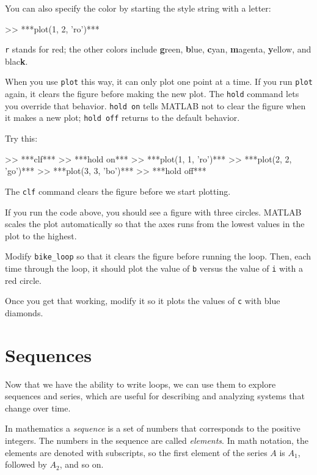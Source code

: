 You can also specify the color by starting the style string with a letter:

\begin{code}
>> ***plot(1, 2, 'ro')***
\end{code}

{\tt r} stands for red; the other colors include {\bf g}reen, {\bf
b}lue, {\bf c}yan, {\bf m}agenta, {\bf y}ellow, and blac{\bf k}.

When you use {\tt plot} this way, it can only plot one point at a
time.  If you run {\tt plot} again, it clears the figure before making
the new plot.  The {\tt hold} command lets you override that behavior.
{\tt hold on} tells MATLAB not to clear the figure when it makes a new
plot; {\tt hold off} returns to the default behavior.


Try this:

\begin{code}
>> ***clf***
>> ***hold on***
>> ***plot(1, 1, 'ro')***
>> ***plot(2, 2, 'go')***
>> ***plot(3, 3, 'bo')***
>> ***hold off***
\end{code}

The {\tt clf} command clears the figure before we start plotting.


If you run the code above, you should see a figure with three circles.  MATLAB scales the plot automatically so that the axes runs from the lowest values in the plot to the highest.

\begin{ex}
Modify \verb"bike_loop" so that it clears the figure before running the loop.  Then, each time through the loop, it should plot the value of {\tt b} versus the value of {\tt i} with a red circle.

Once you get that working, modify it so it plots the values of {\tt c} with blue diamonds.
\end{ex}


\section{Sequences}

Now that we have the ability to write loops, we can use them to explore sequences and series, which are useful for describing and analyzing systems that change over time.

In mathematics a \emph{sequence} is a set of numbers that corresponds to the positive integers.  The numbers in the sequence are called \emph{elements}.  In math notation, the elements are denoted with subscripts, so the first element of the series $A$ is
$A_1$, followed by $A_2$, and so on.

